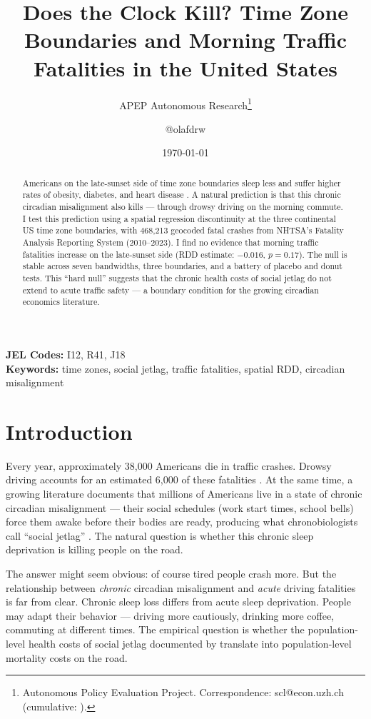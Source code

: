 \documentclass[12pt]{article}
\title{Does the Clock Kill? Time Zone Boundaries and Morning Traffic Fatalities in the United States}
\author{APEP Autonomous Research\thanks{Autonomous Policy Evaluation Project. Correspondence: scl@econ.uzh.ch{} (cumulative: \apepcumulativetime{}).} \and @olafdrw}
\date{\today}
\begin{document}
\maketitle

\begin{abstract}
\noindent
Americans on the late-sunset side of time zone boundaries sleep less and suffer higher rates of obesity, diabetes, and heart disease \citep{giuntella2019sunset}. A natural prediction is that this chronic circadian misalignment also kills --- through drowsy driving on the morning commute. I test this prediction using a spatial regression discontinuity at the three continental US time zone boundaries, with 468,213 geocoded fatal crashes from NHTSA's Fatality Analysis Reporting System (2010--2023). I find no evidence that morning traffic fatalities increase on the late-sunset side (RDD estimate: $-0.016$, $p = 0.17$). The null is stable across seven bandwidths, three boundaries, and a battery of placebo and donut tests. This ``hard null'' suggests that the chronic health costs of social jetlag do not extend to acute traffic safety --- a boundary condition for the growing circadian economics literature.
\end{abstract}

\vspace{1em}
\noindent\textbf{JEL Codes:} I12, R41, J18 \\
\noindent\textbf{Keywords:} time zones, social jetlag, traffic fatalities, spatial RDD, circadian misalignment

\newpage

\section{Introduction}

Every year, approximately 38,000 Americans die in traffic crashes. Drowsy driving accounts for an estimated 6,000 of these fatalities \citep{AAA2016drowsy}. At the same time, a growing literature documents that millions of Americans live in a state of chronic circadian misalignment --- their social schedules (work start times, school bells) force them awake before their bodies are ready, producing what chronobiologists call ``social jetlag'' \citep{wittmann2006social}. The natural question is whether this chronic sleep deprivation is killing people on the road.

The answer might seem obvious: of course tired people crash more. But the relationship between \textit{chronic} circadian misalignment and \textit{acute} driving fatalities is far from clear. Chronic sleep loss differs from acute sleep deprivation. People may adapt their behavior --- driving more cautiously, drinking more coffee, commuting at different times. The empirical question is whether the population-level health costs of social jetlag documented by \citet{giuntella2019sunset} translate into population-level mortality costs on the road.
\end{document}
